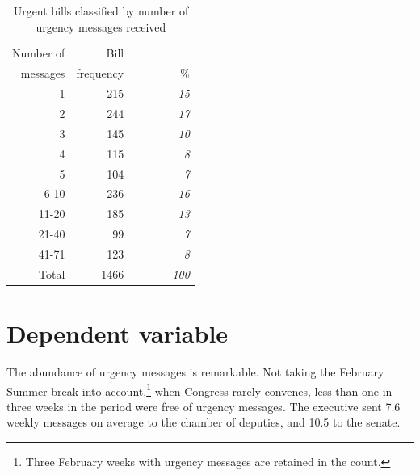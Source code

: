 \documentclass[letter,12pt]{article}
\begin{document}
\begin{table}
\begin{center}
\begin{tabular}{rrr}
Number of &      Bill &     \\
messages  & frequency &  ~~~~~~~~\% \\ \hline
1                 &  215      &  \emph{15}   \\
2                 &  244      &  \emph{17}   \\
3                 &  145      &  \emph{10}   \\
4                 &  115      &  \emph{8}    \\
5                 &  104      &  \emph{7}    \\
6-10              &  236      &  \emph{16}   \\
11-20             &  185      &  \emph{13}   \\
21-40             &  99       &  \emph{7}    \\
41-71             &  123      &  \emph{8}    \\
Total             & 1466      & \emph{100}   \\ \hline
\end{tabular}
\caption{Urgent bills classified by number of urgency messages received}\label{T:billFreqByNurg}
\end{center}
\end{table}


\section{Dependent variable}

The abundance of urgency messages is remarkable. Not taking the February Summer break into account,\footnote{Three February weeks with urgency messages are retained in the count.} when Congress rarely convenes, less than one in three weeks in the period were free of urgency messages. The executive sent 7.6 weekly messages on average to the chamber of deputies, and 10.5 to the senate.

\end{document}
